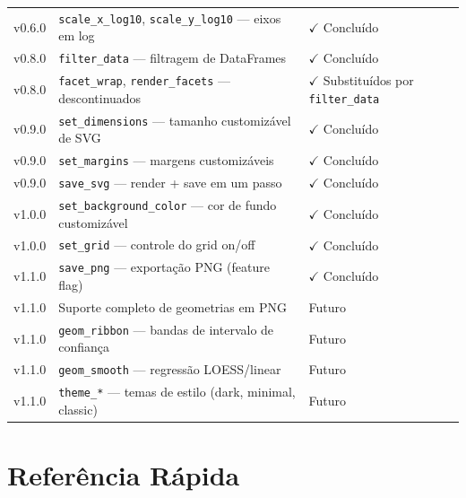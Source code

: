 \documentclass[12pt, a4paper, oneside]{book}
\newcommand{\code}[1]{\texttt{#1}}
\begin{document}
\begin{center}
\begin{tabularx}{\textwidth}{@{}lXl@{}}
    v0.6.0 & \code{scale\_x\_log10}, \code{scale\_y\_log10} --- eixos em log    & $\checkmark$ Conclu\'{i}do \\
    v0.8.0 & \code{filter\_data} --- filtragem de DataFrames                    & $\checkmark$ Conclu\'{i}do \\
    v0.8.0 & \code{facet\_wrap}, \code{render\_facets} --- descontinuados        & $\checkmark$ Substituídos por \code{filter\_data} \\
    v0.9.0 & \code{set\_dimensions} --- tamanho customizável de SVG             & $\checkmark$ Conclu\'{i}do \\
    v0.9.0 & \code{set\_margins} --- margens customizáveis                        & $\checkmark$ Conclu\'{i}do \\
    v0.9.0 & \code{save\_svg} --- render + save em um passo                      & $\checkmark$ Conclu\'{i}do \\
    v1.0.0 & \code{set\_background\_color} --- cor de fundo customizável          & $\checkmark$ Conclu\'{i}do \\
    v1.0.0 & \code{set\_grid} --- controle do grid on/off                          & $\checkmark$ Conclu\'{i}do \\
    v1.1.0 & \code{save\_png} --- exportação PNG (feature flag)                 & $\checkmark$ Conclu\'{i}do \\
    v1.1.0 & Suporte completo de geometrias em PNG                               & Futuro \\
    v1.1.0 & \code{geom\_ribbon} --- bandas de intervalo de confiança           & Futuro \\
    v1.1.0 & \code{geom\_smooth} --- regressão LOESS/linear                    & Futuro \\
    v1.1.0 & \code{theme\_*} --- temas de estilo (dark, minimal, classic)       & Futuro \\
    \bottomrule
  \end{tabularx}
\end{center}

\chapter{Referência Rápida}
\end{document}
